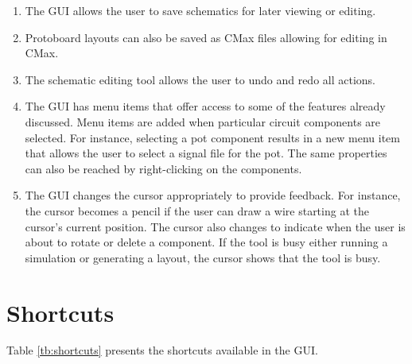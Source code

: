\begin{enumerate}
\item The GUI allows the user to save schematics for later viewing or editing.
\item Protoboard layouts can also be saved as CMax files allowing for editing
in CMax.
\item The schematic editing tool allows the user to undo and redo all actions.
\item The GUI has menu items that offer access to some of the features already
discussed. Menu items are added when particular circuit components are selected.
For instance, selecting a pot component results in a new menu item that allows
the user to select a signal file for the pot. The same properties can also be
reached by right-clicking on the components.
\item The GUI changes the cursor appropriately to provide feedback. For instance,
the cursor becomes
a pencil if the user can draw a wire starting at the cursor's current position.
The cursor also changes to indicate when the user is about to rotate or delete
a component. If the tool is busy either running a simulation or generating a
layout, the cursor shows that the tool is busy.
\end{enumerate}

\section{Shortcuts}
Table \ref{tb:shortcuts} presents the shortcuts available in the GUI.


